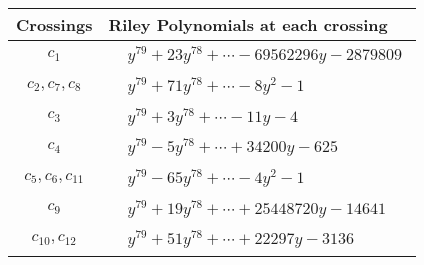 \documentclass[1p]{elsarticle_modified}
\theoremstyle{definition}
\begin{document}
\begin{tabular}{m{50pt}|m{274pt}}
Crossings & \hspace{64pt}Riley Polynomials at each crossing \\
\hline $$\begin{aligned}c_{1}\end{aligned}$$&$\begin{aligned}
&y^{79}+23 y^{78}+\cdots-69562296 y-2879809
\end{aligned}$\\
\hline $$\begin{aligned}c_{2},c_{7},c_{8}\end{aligned}$$&$\begin{aligned}
&y^{79}+71 y^{78}+\cdots-8 y^2-1
\end{aligned}$\\
\hline $$\begin{aligned}c_{3}\end{aligned}$$&$\begin{aligned}
&y^{79}+3 y^{78}+\cdots-11 y-4
\end{aligned}$\\
\hline $$\begin{aligned}c_{4}\end{aligned}$$&$\begin{aligned}
&y^{79}-5 y^{78}+\cdots+34200 y-625
\end{aligned}$\\
\hline $$\begin{aligned}c_{5},c_{6},c_{11}\end{aligned}$$&$\begin{aligned}
&y^{79}-65 y^{78}+\cdots-4 y^2-1
\end{aligned}$\\
\hline $$\begin{aligned}c_{9}\end{aligned}$$&$\begin{aligned}
&y^{79}+19 y^{78}+\cdots+25448720 y-14641
\end{aligned}$\\
\hline $$\begin{aligned}c_{10},c_{12}\end{aligned}$$&$\begin{aligned}
&y^{79}+51 y^{78}+\cdots+22297 y-3136
\end{aligned}$\\
\hline
\end{tabular}
\vskip 2pc
\end{document}
